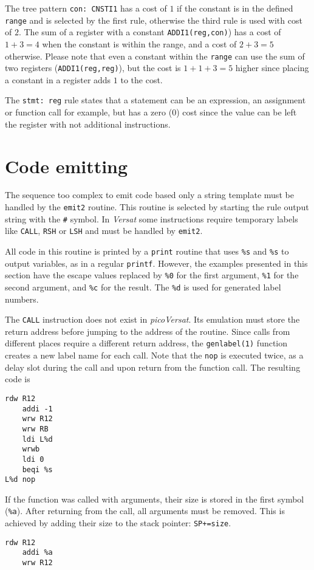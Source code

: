 The tree pattern {\tt con: CNSTI1} has a cost of $1$ if the
constant is in the defined {\tt range} and is selected by
the first rule, otherwise the third rule is used with cost of $2$.
The sum of a register with a constant {\tt ADDI1(reg,con)})
has a cost of $1+3=4$ when the
constant is within the range, and a cost of $2+3=5$ otherwise.
Please note that even a constant within the {\tt range} can use
the sum of two registers ({\tt ADDI1(reg,reg)}),
but the cost is $1+1+3=5$
higher since placing a constant in a register adds $1$ to the cost.

The {\tt stmt: reg} rule states that a statement can be an expression,
an assignment or function call for example, but has a zero ($0$)
cost since the value can be left the register with not additional
instructions.

\section{Code emitting}
The sequence too complex to emit code based only a string template
must be handled by the {\tt emit2} routine.
This routine is selected by starting the rule output string with
the {\tt \#} symbol.
In {\it Versat} some instructions require temporary labels like
{\tt CALL}, {\tt RSH} or {\tt LSH} and must be handled by {\tt emit2}.

All code in this routine is printed by a {\tt print} routine
that uses {\tt \%s} and {\tt \%s} to output variables,
as in a regular {\tt printf}.
However, the examples presented in this section have the
escape values replaced by {\tt \%0} for the first argument,
{\tt \%1} for the second argument, and {\tt \%c} for the result.
The {\tt \%d} is used for generated label numbers.

The {\tt CALL} instruction does not exist in {\it picoVersat}.
Its emulation must store the return address before
jumping to the address of the routine.
Since calls from different places require a different
return address, the {\tt genlabel(1)} function creates
a new label name for each call. Note that the {\tt nop}
is executed twice, as a delay slot during the call and
upon return from the function call.
The resulting code is
\begin{Verbatim}[baselinestretch=1.2]
    rdw R12
    addi -1
    wrw R12
    wrw RB
    ldi L%d
    wrwb
    ldi 0
    beqi %s
L%d nop
\end{Verbatim}

If the function was called with arguments, their size
is stored in the first symbol ({\tt \%a}).
After returning from the call, all arguments must be removed.
This is achieved by adding their size to the stack pointer:
{\tt SP+=size}.
\begin{Verbatim}[baselinestretch=1.2]
    rdw R12
    addi %a
    wrw R12
\end{Verbatim}

